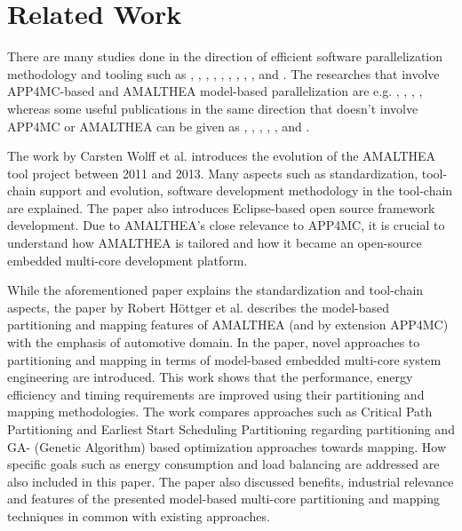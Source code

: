 

\section{Related Work}
There are many studies done in the direction of efficient software parallelization methodology and tooling such as \cite{toolchaintailoringapp4mc}, \cite{priorpaperapp4mc}, \cite{comparisonpaperapp4mc}, \cite{constrainedpaper}, \cite{autosarospaper1}, \cite{paper2}, \cite{paper3}, \cite{paper4}, \cite{paper5}, and \cite{paper6}.
The researches that involve APP4MC-based and AMALTHEA model-based parallelization are e.g. \cite{toolchaintailoringapp4mc}, \cite{priorpaperapp4mc}, \cite{comparisonpaperapp4mc}, \cite{constrainedpaper}, whereas some useful publications in the same direction that doesn't involve APP4MC or AMALTHEA can be given as \cite{autosarospaper1}, \cite{paper2}, \cite{paper3}, \cite{paper4}, \cite{paper5}, and \cite{paper6}.

The work by Carsten Wolff et al. \cite{toolchaintailoringapp4mc} introduces the evolution of the AMALTHEA tool project between 2011 and 2013. Many aspects such as standardization, tool-chain support and evolution, software development methodology in the tool-chain are explained. The paper also introduces Eclipse-based open source framework development. Due to AMALTHEA's close relevance to APP4MC, it is crucial to understand how AMALTHEA is tailored and how it became an open-source embedded multi-core development platform. 

While the aforementioned paper explains the standardization and tool-chain aspects, the paper by Robert H{\"o}ttger et al. \cite{priorpaperapp4mc} describes the model-based partitioning and mapping features of AMALTHEA (and by extension APP4MC) with the emphasis of automotive domain. In the paper, novel approaches to partitioning and mapping in terms of model-based embedded multi-core system engineering are introduced. This work shows that the performance, energy efficiency and timing requirements are improved using their partitioning and mapping methodologies. The work compares approaches such as Critical Path Partitioning and Earliest Start Scheduling Partitioning regarding partitioning and GA- (Genetic Algorithm) based optimization approaches towards mapping. How specific goals such as energy consumption and load balancing are addressed are also included in this paper. The paper also discussed benefits, industrial relevance and features of the presented model-based multi-core partitioning and mapping techniques in common with existing approaches.

